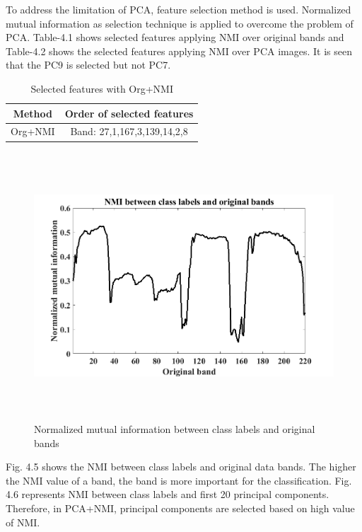 \documentclass[document.tex]{subfiles}
\begin{document}
To address the limitation of PCA, feature selection method is used. Normalized mutual information as selection technique is applied to overcome the problem of PCA. Table-4.1 shows selected features applying NMI over original bands and Table-4.2 shows the selected features applying NMI over PCA images. It is seen that the PC9 is selected but not PC7. 
\begin{table}[H]
	\caption{Selected features with Org+NMI}
	\begin{center}
		\begin{tabular}{|c|c|}
			\hline
			Method & Order of selected features\\ \hline
			Org+NMI & Band: 27,1,167,3,139,14,2,8\\ \hline
		\end{tabular}
	\end{center}
	\label{tab:Selected features with Org+NMI}
\end{table}
\begin{figure}[H]
	\begin{center}
		\includegraphics[height=10.0cm]{imgs/OrgNmi.png}
	\end{center}
	\caption{Normalized mutual information between class labels and original bands}
	\label{fig:Normalized mutual information between class labels and original bands}
\end{figure}

\noindent Fig. 4.5 shows the NMI between class labels and original data bands. The higher the NMI value of a band, the band is more important for the classification. Fig. 4.6 represents NMI between class labels and first 20 principal components. Therefore, in PCA+NMI, principal components are selected based on high value of NMI. 
\end{document}

